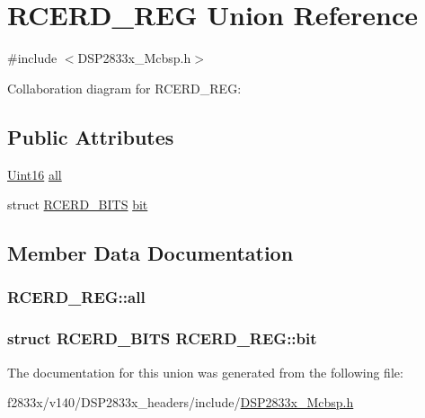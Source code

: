\hypertarget{union_r_c_e_r_d___r_e_g}{}\section{R\+C\+E\+R\+D\+\_\+\+R\+E\+G Union Reference}
\label{union_r_c_e_r_d___r_e_g}


{\ttfamily \#include $<$D\+S\+P2833x\+\_\+\+Mcbsp.\+h$>$}



Collaboration diagram for R\+C\+E\+R\+D\+\_\+\+R\+E\+G\+:
\subsection*{Public Attributes}
\begin{DoxyCompactItemize}
\item 
\hyperlink{_d_s_p2833x___device_8h_a59a9f6be4562c327cbfb4f7e8e18f08b}{Uint16} \hyperlink{union_r_c_e_r_d___r_e_g_a47179f85357d6c7ea1c8343d8351a0b7}{all}
\item 
struct \hyperlink{struct_r_c_e_r_d___b_i_t_s}{R\+C\+E\+R\+D\+\_\+\+B\+I\+T\+S} \hyperlink{union_r_c_e_r_d___r_e_g_aae937319ea59b1c24984dfe68516292c}{bit}
\end{DoxyCompactItemize}


\subsection{Member Data Documentation}
\hypertarget{union_r_c_e_r_d___r_e_g_a47179f85357d6c7ea1c8343d8351a0b7}{}
\subsubsection[{all}]{ R\+C\+E\+R\+D\+\_\+\+R\+E\+G\+::all}\label{union_r_c_e_r_d___r_e_g_a47179f85357d6c7ea1c8343d8351a0b7}
\hypertarget{union_r_c_e_r_d___r_e_g_aae937319ea59b1c24984dfe68516292c}{}
\subsubsection[{bit}]{\setlength{\rightskip}{0pt plus 5cm}struct {\bf R\+C\+E\+R\+D\+\_\+\+B\+I\+T\+S} R\+C\+E\+R\+D\+\_\+\+R\+E\+G\+::bit}\label{union_r_c_e_r_d___r_e_g_aae937319ea59b1c24984dfe68516292c}


The documentation for this union was generated from the following file\+:\begin{DoxyCompactItemize}
\item 
f2833x/v140/\+D\+S\+P2833x\+\_\+headers/include/\hyperlink{_d_s_p2833x___mcbsp_8h}{D\+S\+P2833x\+\_\+\+Mcbsp.\+h}\end{DoxyCompactItemize}

